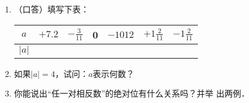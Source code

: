 \begin{ex}
	\begin{enumerate}
		\item （口答）填写下表：
		\begin{center}
			\begin{tabular}{c|cccccc}
				\hline
				$a$ & $+7.2$ & $-\frac{3}{11}$ & 0& $-1012$ &$+1\frac{2}{11}$ &$-1\frac{2}{11}$\\
				\hline
				$|a|$\\
				\hline
			\end{tabular}       
		\end{center}
		\item 如果$|a|=4$，试问：$a$表示何数？
		\item 你能说出“任一对相反数”的绝对位有什么关系吗？并举
		出两例．
	\end{enumerate}
\end{ex}

